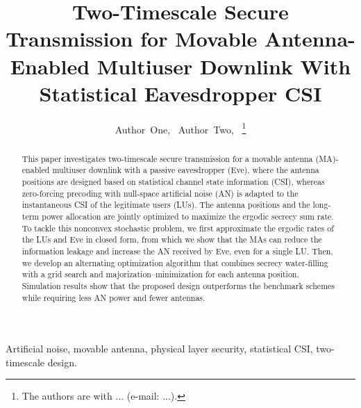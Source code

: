 \documentclass[journal]{IEEEtran}
\begin{document}
\title{Two-Timescale Secure Transmission for Movable Antenna-Enabled Multiuser Downlink With Statistical Eavesdropper CSI}

\author{Author~One,~
        Author~Two,~
\thanks{The authors are with ... (e-mail: ...).}}


\maketitle

\begin{abstract}
This paper investigates two-timescale secure transmission for a movable antenna (MA)-enabled multiuser downlink with a passive eavesdropper (Eve), where the antenna positions are designed based on statistical channel state information (CSI), whereas zero-forcing precoding with null-space artificial noise (AN) is adapted to the instantaneous CSI of the legitimate users (LUs). The antenna positions and the long-term power allocation are jointly optimized to maximize the ergodic secrecy sum rate. To tackle this nonconvex stochastic problem, we first approximate the ergodic rates of the LUs and Eve in closed form, from which we show that the MAs can reduce the information leakage and increase the AN received by Eve, even for a single LU. Then, we develop an alternating optimization algorithm that combines secrecy water-filling with a grid search and majorization--minimization for each antenna position. Simulation results show that the proposed design outperforms the benchmark schemes while requiring less AN power and fewer antennas.
\end{abstract}

\begin{IEEEkeywords}
Artificial noise, movable antenna, physical layer security, statistical CSI, two-timescale design.
\end{IEEEkeywords}

\IEEEpeerreviewmaketitle

\end{document}
